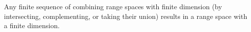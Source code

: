 \begin{corollary}
        Any finite sequence of combining range spaces with finite \VC
        dimension (by intersecting, complementing, or taking their
        union) results in a range space with a finite \VC dimension.
        
    \end{corollary}

